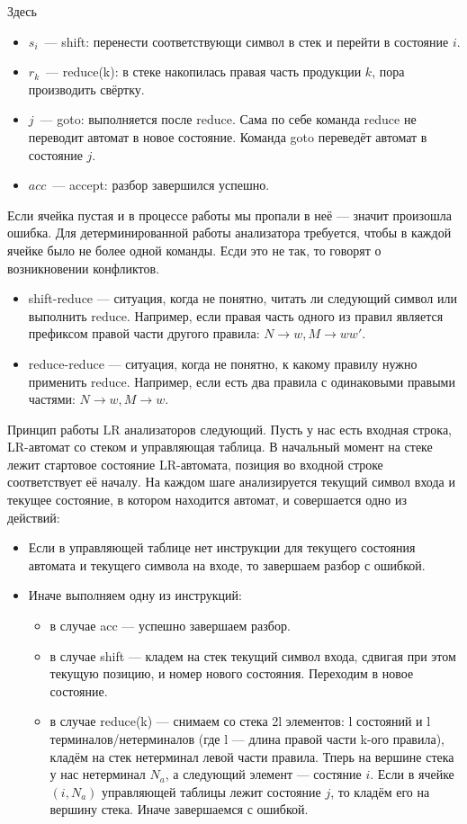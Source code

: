 Здесь
\begin{itemize}
  \item $s_i$~--- shift: перенести соответствующи символ в стек и перейти в состояние $i$.
  \item $r_k$~--- reduce(k): в стеке накопилась правая часть продукции $k$, пора производить свёртку.
  \item $j$~--- goto: выполняется после reduce. Сама по себе команда reduce не переводит автомат в новое состояние. Команда goto переведёт автомат в состояние $j$.
  \item $acc$~--- accept: разбор завершился успешно.
\end{itemize}

Если ячейка пустая и в процессе работы мы пропали в неё --- значит произошла ошибка. Для детерминированной работы анализатора требуется, чтобы в каждой ячейке было не более одной команды. Есди это не так, то говорят о возникновении конфликтов.

\begin{itemize}
\item shift-reduce --- ситуация, когда не понятно, читать ли следующий символ или выполнить reduce. Например, если правая часть одного из правил является префиксом правой части другого правила: $N \rightarrow w, M \rightarrow ww'$.
\item reduce-reduce --- ситуация, когда не понятно, к какому правилу нужно применить reduce. Например, если есть два правила с одинаковыми правыми частями: $N \rightarrow w, M \rightarrow w$.
\end{itemize}

Принцип работы LR анализаторов следующий. Пусть у нас есть входная строка, LR-автомат со стеком и управляющая таблица.
В начальный момент на стеке лежит стартовое состояние LR-автомата, позиция во входной строке соответствует её началу.
На каждом шаге анализируется текущий символ входа и текущее состояние, в котором находится автомат, и совершается одно из действий:
\begin{itemize}
\item Если в управляющей таблице нет инструкции для текущего состояния автомата и текущего символа на входе, то завершаем разбор с ошибкой.
\item Иначе выполняем одну из инструкций:
\begin{itemize}
\item в случае acc --- успешно завершаем разбор.
\item в случае shift --- кладем на стек текущий символ входа, сдвигая при этом текущую позицию, и номер нового состояния. Переходим в новое состояние.
\item в случае reduce(k) --- снимаем со стека 2l элементов: l состояний и l терминалов/нетерминалов (где l --- длина правой части k-ого правила), кладём на стек нетерминал левой части правила. Тперь на вершине стека у нас нетерминал $N_a$, а следующий элемент --- состяние $i$. Если в ячейке $(i,N_a)$ управляющей таблицы лежит состояние $j$, то кладём его на вершину стека. Иначе завершаемся с ошибкой.
\end{itemize}
\end{itemize}


